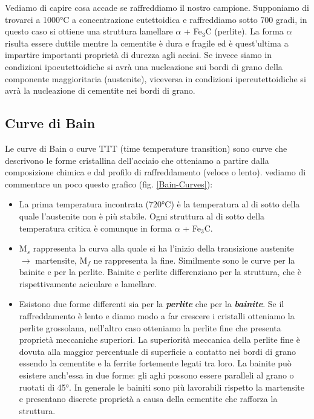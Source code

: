 Vediamo di capire cosa accade se raffreddiamo il nostro campione. Supponiamo di trovarci a 1000°C a concentrazione eutettoidica e raffreddiamo sotto 700 gradi, in questo caso si ottiene una struttura lamellare $\alpha$ + Fe$_3$C (perlite). La forma $\alpha$ risulta essere duttile mentre la cementite è dura e fragile ed è quest'ultima a impartire importanti proprietà di durezza agli acciai.
Se invece siamo in condizioni ipoeutettoidiche si avrà una nucleazione sui bordi di grano della componente maggioritaria (austenite), viceversa in condizioni ipereutettoidiche si avrà la nucleazione di cementite nei bordi di grano.

\subsection{Curve di Bain}

Le curve di Bain o curve TTT (time temperature transition) sono curve che descrivono le forme cristallina dell'acciaio che otteniamo a partire dalla composizione chimica e dal profilo di raffreddamento (veloce o lento).
vediamo di commentare un poco questo grafico (fig. \ref{Bain-Curves}):
\begin{itemize}
    \item La prima temperatura incontrata (720°C) è la temperatura al di sotto della quale l'austenite non è più stabile. Ogni struttura al di sotto della temperatura critica è comunque in forma $\alpha$ + Fe$_3$C.
    \item M$_s$ rappresenta la curva alla quale si ha l'inizio della transizione austenite $\rightarrow$ martensite, M$_f$ ne rappresenta la fine. Similmente sono le curve per la bainite e per la perlite. Bainite e perlite differenziano per la struttura, che è rispettivamente aciculare e lamellare.
    \item Esistono due forme differenti sia per la \textbf{\textit{perlite}} che per la \textbf{\textit{bainite}}. Se il raffreddamento è lento e diamo modo a far crescere i cristalli otteniamo la perlite grossolana, nell'altro caso otteniamo la perlite fine che presenta proprietà meccaniche superiori. La superiorità meccanica della perlite fine è dovuta alla maggior percentuale di superficie a contatto nei bordi di grano essendo la cementite e la ferrite fortemente legati tra loro. La bainite può esistere anch'essa in due forme: gli aghi possono essere paralleli al grano o ruotati di 45°. In generale le bainiti sono più lavorabili rispetto la martensite e presentano discrete proprietà a causa della cementite che rafforza la struttura.
\end{itemize}

